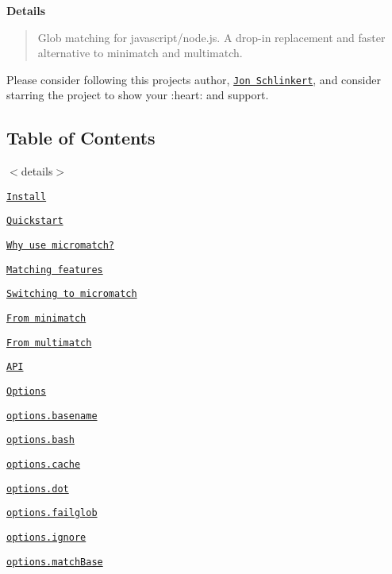 {\bfseries Details}

\begin{quote}
Glob matching for javascript/node.\+js. A drop-\/in replacement and faster alternative to minimatch and multimatch. \end{quote}


Please consider following this project\textquotesingle{}s author, \href{https://github.com/jonschlinkert}{\tt Jon Schlinkert}, and consider starring the project to show your \+:heart\+: and support.

\subsection*{Table of Contents}

$<$details$>$


\begin{DoxyItemize}
\item \href{#install}{\tt Install}
\item \href{#quickstart}{\tt Quickstart}
\item \href{#why-use-micromatch}{\tt Why use micromatch?}
\begin{DoxyItemize}
\item \href{#matching-features}{\tt Matching features}
\end{DoxyItemize}
\item \href{#switching-to-micromatch}{\tt Switching to micromatch}
\begin{DoxyItemize}
\item \href{#from-minimatch}{\tt From minimatch}
\item \href{#from-multimatch}{\tt From multimatch}
\end{DoxyItemize}
\item \href{#api}{\tt A\+PI}
\item \href{#options}{\tt Options}
\begin{DoxyItemize}
\item \href{#optionsbasename}{\tt options.\+basename}
\item \href{#optionsbash}{\tt options.\+bash}
\item \href{#optionscache}{\tt options.\+cache}
\item \href{#optionsdot}{\tt options.\+dot}
\item \href{#optionsfailglob}{\tt options.\+failglob}
\item \href{#optionsignore}{\tt options.\+ignore}
\item \href{#optionsmatchbase}{\tt options.\+match\+Base}

\end{DoxyItemize}
\end{DoxyItemize}
